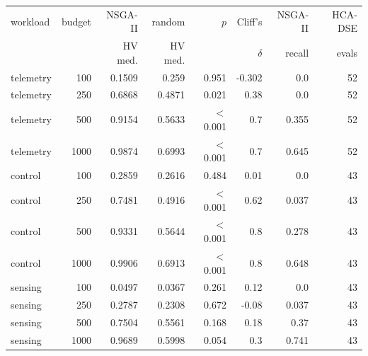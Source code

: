 \scriptsize
\setlength{\tabcolsep}{3.5pt}
\begin{tabular}{lrrrrrrr}
\toprule
workload & budget & NSGA-II & random & $p$ & Cliff's & NSGA-II & HCA-DSE \\
 & & HV med. & HV med. & & $\delta$ & recall & evals \\
\midrule
telemetry & 100 & 0.1509 & 0.259 & 0.951 & -0.302 & 0.0 & 52 \\
telemetry & 250 & 0.6868 & 0.4871 & 0.021 & 0.38 & 0.0 & 52 \\
telemetry & 500 & 0.9154 & 0.5633 & $<$0.001 & 0.7 & 0.355 & 52 \\
telemetry & 1000 & 0.9874 & 0.6993 & $<$0.001 & 0.7 & 0.645 & 52 \\
control & 100 & 0.2859 & 0.2616 & 0.484 & 0.01 & 0.0 & 43 \\
control & 250 & 0.7481 & 0.4916 & $<$0.001 & 0.62 & 0.037 & 43 \\
control & 500 & 0.9331 & 0.5644 & $<$0.001 & 0.8 & 0.278 & 43 \\
control & 1000 & 0.9906 & 0.6913 & $<$0.001 & 0.8 & 0.648 & 43 \\
sensing & 100 & 0.0497 & 0.0367 & 0.261 & 0.12 & 0.0 & 43 \\
sensing & 250 & 0.2787 & 0.2308 & 0.672 & -0.08 & 0.037 & 43 \\
sensing & 500 & 0.7504 & 0.5561 & 0.168 & 0.18 & 0.37 & 43 \\
sensing & 1000 & 0.9689 & 0.5998 & 0.054 & 0.3 & 0.741 & 43 \\
\bottomrule
\end{tabular}
